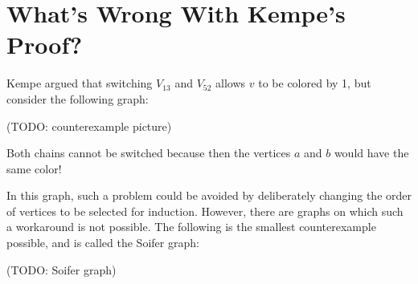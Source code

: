     \section{What's Wrong With Kempe's Proof?}
        
        Kempe argued that switching $V_{13}$ and $V_{52}$ allows $v$ to be colored by 1, but consider the following graph:
        
        (TODO: counterexample picture)
        
        Both chains cannot be switched because then the vertices $a$ and $b$ would have the same color!
        
        In this graph, such a problem could be avoided by deliberately changing the order of vertices to be selected for induction. However, there are graphs on which such a workaround is not possible. The following is the smallest counterexample possible, and is called the Soifer graph:
        
        (TODO: Soifer graph)
    
